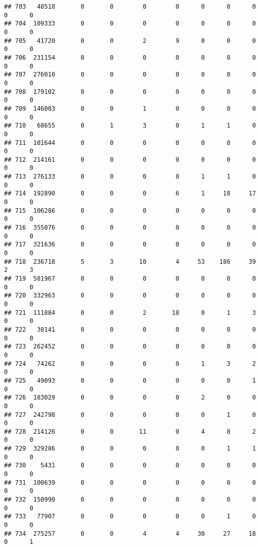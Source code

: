 \documentclass[
]{article}
\begin{document}
\begin{verbatim}
## 703   48518       0       0        0        0      0      0      0     0      0
## 704  109333       0       0        0        0      0      0      0     0      0
## 705   41720       0       0        2        9      0      0      0     0      0
## 706  231154       0       0        0        0      0      0      0     0      0
## 707  276010       0       0        0        0      0      0      0     0      0
## 708  179102       0       0        0        0      0      0      0     0      0
## 709  146003       0       0        1        0      0      0      0     0      0
## 710   68655       0       1        3        0      1      1      0     0      0
## 711  101644       0       0        0        0      0      0      0     0      0
## 712  214161       0       0        0        0      0      0      0     0      0
## 713  276133       0       0        0        0      1      1      0     0      0
## 714  192890       0       0        0        6      1     18     17     0      0
## 715  106286       0       0        0        0      0      0      0     0      0
## 716  355076       0       0        0        0      0      0      0     0      0
## 717  321636       0       0        0        0      0      0      0     0      0
## 718  236718       5       3       10        4     53    186     39     2      3
## 719  581967       0       0        0        0      0      0      0     0      0
## 720  332963       0       0        0        0      0      0      0     0      0
## 721  111884       0       0        2       18      0      1      3     0      0
## 722   38141       0       0        0        0      0      0      0     0      0
## 723  262452       0       0        0        0      0      0      0     0      0
## 724   74262       0       0        0        0      1      3      2     0      0
## 725   49093       0       0        0        0      0      0      1     0      0
## 726  183029       0       0        0        0      2      0      0     0      0
## 727  242798       0       0        0        0      0      1      0     0      0
## 728  214126       0       0       11        0      4      8      2     0      0
## 729  329286       0       0        0        0      0      1      1     0      0
## 730    5431       0       0        0        0      0      0      0     0      0
## 731  100639       0       0        0        0      0      0      0     0      0
## 732  150990       0       0        0        0      0      0      0     0      0
## 733   77907       0       0        0        0      0      1      0     0      0
## 734  275257       0       0        4        4     30     27     18     0      1

\end{verbatim}
\end{document}
